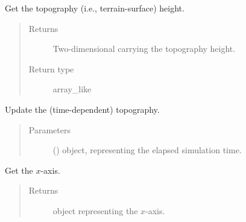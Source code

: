 \documentclass[letterpaper,10pt,english]{sphinxmanual}
\begin{document}
\begin{fulllineitems}
\begin{fulllineitems}
\end{fulllineitems}


\begin{fulllineitems}
\label{\detokenize{api:grids.xyz_grid.XYZGrid.topography_height}}
Get the topography (i.e., terrain-surface) height.
\begin{quote}\begin{description}
\item[{Returns}] \leavevmode
Two-dimensional  carrying the topography height.

\item[{Return type}] \leavevmode
array\_like

\end{description}\end{quote}

\end{fulllineitems}


\begin{fulllineitems}
\label{\detokenize{api:grids.xyz_grid.XYZGrid.update_topography}}
Update the (time-dependent) topography.
\begin{quote}\begin{description}
\item[{Parameters}] \leavevmode
{} () \textendash{}  object, representing the elapsed simulation time.

\end{description}\end{quote}

\end{fulllineitems}


\begin{fulllineitems}
\label{\detokenize{api:grids.xyz_grid.XYZGrid.x}}
Get the \(x\)-axis.
\begin{quote}\begin{description}
\item[{Returns}] \leavevmode
{\hyperref[\detokenize{api:grids.axis.Axis}]{}} object representing the \(x\)-axis.


\end{description}
\end{quote}
\end{fulllineitems}
\end{fulllineitems}
\end{document}
